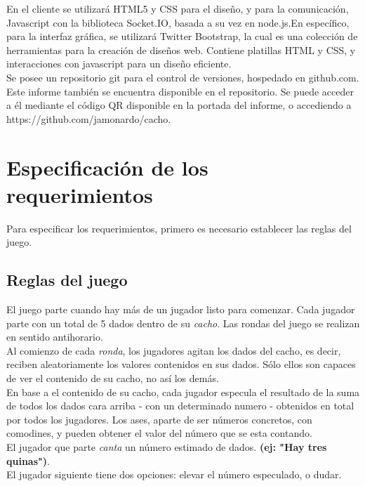 \documentclass[a4paper,11pt]{article}
\begin{document}
En el cliente se utilizará HTML5 y CSS para el diseño, y para la comunicación, Javascript
con la biblioteca Socket.IO, basada a su vez en node.js.En específico, para 
 la interfaz gráfica, se utilizará Twitter Bootstrap, la cual es una colección
de herramientas para la creación de diseños web. Contiene platillas HTML y CSS,
y interacciones con javascript para un diseño eficiente. \\

Se posee un repositorio git para el control de versiones, hospedado en 
github.com. Este informe también se encuentra disponible en el repositorio.
Se puede acceder a él mediante el código QR disponible en la portada del 
informe, o accediendo a https://github.com/jamonardo/cacho.

\newpage
\section{Especificación de los requerimientos}
	
	Para especificar los requerimientos, primero es necesario establecer 
las reglas del juego.

\subsection{Reglas del juego}

	El juego parte cuando hay más de un jugador listo para comenzar.
 Cada jugador parte con un total de 5 dados dentro de su \textit{cacho}. Las 
rondas del juego se realizan en sentido antihorario.\\

	Al comienzo de cada \textit{ronda}, los jugadores agitan los dados del 
cacho, es decir, reciben aleatoriamente los valores contenidos en sus dados.
Sólo ellos son capaces de ver el contenido de su cacho, no así los demás. \\

	En base a el contenido de su cacho, cada jugador especula el resultado 
de la suma de todos los dados cara arriba - con un determinado numero - 
obtenidos en total por todos los jugadores. Los ases, aparte de ser números
concretos, con comodines, y pueden obtener el valor del número que se esta 
contando.\\

	El jugador que parte \textit{canta} un número estimado de dados. 
\textbf{(ej: "Hay tres quinas")}. \\

	El jugador siguiente tiene dos opciones: elevar el número especulado,
o dudar. \\
\end{document}
